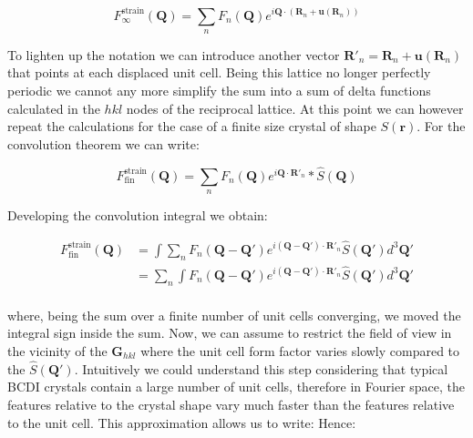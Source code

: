 \begin{equation}
    F^{\text{strain}}_{\infty}(\mathbf{Q}) = 
    \sum_{n} F_n(\mathbf{Q}) e^{i \mathbf{Q} \cdot (\mathbf{R}_n + \mathbf{u}(\mathbf{R}_n))}
   \label{eq:strain1}
\end{equation} 

To lighten up the notation we can introduce another vector $\mathbf{R}'_n = \mathbf{R}_n + \mathbf{u}(\mathbf{R}_n)$ that 
points at each displaced unit cell. Being this lattice no longer perfectly periodic we cannot any more simplify the sum 
into a sum of delta functions calculated in the $hkl$ nodes of the reciprocal lattice. 
At this point we can however repeat the calculations for the case of a finite size crystal of shape $S(\mathbf{r})$. 
For the convolution theorem we can write: 

\begin{equation}
    F^{\text{strain}}_{\text{fin}}(\mathbf{Q}) = 
    \sum_{n} F_n(\mathbf{Q}) e^{i \mathbf{Q} \cdot \mathbf{R}'_n} \ast \widehat{S}(\mathbf{Q})
   \label{eq:strain_fin}
\end{equation}

Developing the convolution integral we obtain: 

\begin{equation}
    \begin{aligned}
    F^{\text{strain}}_{\text{fin}}(\mathbf{Q}) &= 
    \int \sum_{n} F_n(\mathbf{Q} -\mathbf{Q'}) e^{i (\mathbf{Q}-\mathbf{Q'}) \cdot \mathbf{R}'_n} \widehat{S}(\mathbf{Q'})d^3\mathbf{Q'} \\
    &= \sum_{n} \int F_n(\mathbf{Q} -\mathbf{Q'}) e^{i (\mathbf{Q}-\mathbf{Q'}) \cdot \mathbf{R}'_n} \widehat{S}(\mathbf{Q'})d^3\mathbf{Q'} \\ 
   \label{eq:strain_fin2}
    \end{aligned}
\end{equation}

where, being the sum over a finite number of unit cells converging, we moved the integral sign inside the sum. 
Now, we can assume to restrict the field of view in the vicinity of the $\mathbf{G}_{hkl}$ where the unit cell 
form factor varies slowly compared to the $\widehat{S}(\mathbf{Q'})$. Intuitively we could understand this step considering 
that typical BCDI crystals contain a large number of unit cells, therefore in Fourier space, the features relative to 
the crystal shape vary much faster than the features relative to the unit cell. This approximation allows us to write:
Hence: 

